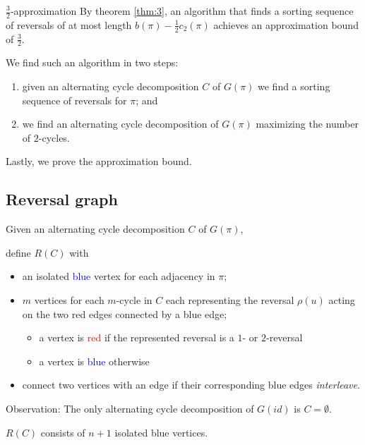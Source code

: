 \documentclass{beamer}
\theoremstyle{definition}
\def\spadding{\vspace{0.25cm}}
\def\b{\textcolor{blue}}
\def\r{\textcolor{red}}
\begin{document}
\begin{frame}

\begin{block}{$\frac{3}{2}$-approximation}
By theorem \ref{thm:3}, an algorithm that finds a sorting sequence of reversals of at most length $b(\pi) - \frac{1}{2} c_2(\pi)$ achieves an approximation bound of $\frac{3}{2}$. \pause\spadding

We find such an algorithm in two steps:
\begin{enumerate}
    \item given an alternating cycle decomposition $C$ of $G(\pi)$ we find a sorting sequence of reversals for $\pi$\pause; and
    \item we find an alternating cycle decomposition of $G(\pi)$ maximizing the number of $2$-cycles.
\end{enumerate}
\end{block}\pause

Lastly, we prove the approximation bound.

\end{frame}

\subsection{Reversal graph}

\begin{frame}

\begin{definition}
Given an alternating cycle decomposition $C$ of $G(\pi)$, \par\pause
define $R(C)$ with
\begin{itemize}
    \item an isolated \b{blue} vertex for each adjacency in $\pi$\pause;
    \item $m$ vertices for each $m$-cycle in $C$ each representing the reversal $\rho(u)$ acting on the two red edges connected by a blue edge\pause;
    \begin{itemize}
        \item a vertex is \r{red} if the represented reversal is a $1$- or $2$-reversal
        \item a vertex is \b{blue} otherwise
    \end{itemize}\pause
    \item connect two vertices with an edge if their corresponding blue edges \textit{interleave}.
\end{itemize}
\end{definition}\pause

Observation: The only alternating cycle decomposition of $G(id)$ is $C = \emptyset$.\pause

\begin{corollary}
$R(C)$ consists of $n+1$ isolated blue vertices.
\end{corollary}

\end{frame}
\end{document}
